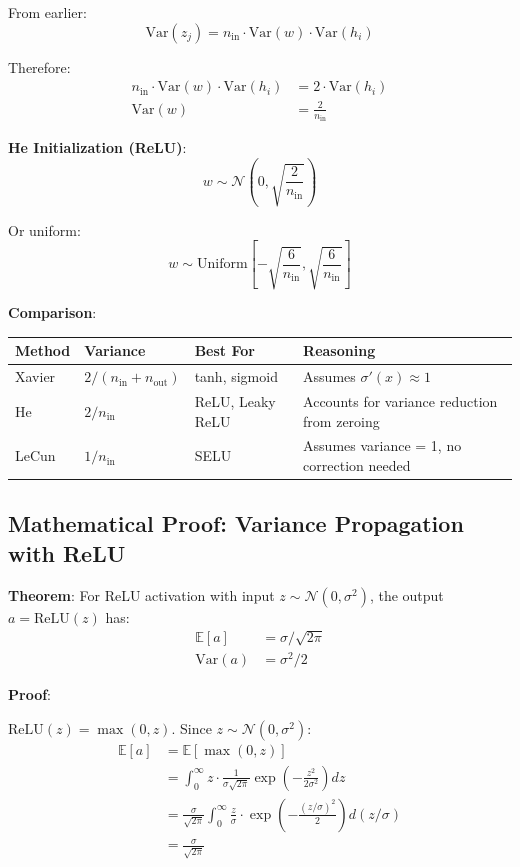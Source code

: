 From earlier:
\[
\text{Var}(z_j) = n_{\text{in}} \cdot \text{Var}(w) \cdot \text{Var}(h_i)
\]

Therefore:
\begin{align*}
n_{\text{in}} \cdot \text{Var}(w) \cdot \text{Var}(h_i) &= 2 \cdot \text{Var}(h_i) \\
\text{Var}(w) &= \frac{2}{n_{\text{in}}}
\end{align*}

\textbf{He Initialization (ReLU)}:
\[
w \sim \mathcal{N}\left(0, \sqrt{\frac{2}{n_{\text{in}}}}\right)
\]

Or uniform:
\[
w \sim \text{Uniform}\left[-\sqrt{\frac{6}{n_{\text{in}}}}, \sqrt{\frac{6}{n_{\text{in}}}}\right]
\]

\textbf{Comparison}:

\begin{table}[h]
\centering
\begin{tabular}{llll}
\toprule
\textbf{Method} & \textbf{Variance} & \textbf{Best For} & \textbf{Reasoning} \\
\midrule
Xavier & $2/(n_{\text{in}} + n_{\text{out}})$ & tanh, sigmoid & Assumes $\sigma'(x) \approx 1$ \\
He & $2/n_{\text{in}}$ & ReLU, Leaky ReLU & Accounts for variance reduction from zeroing \\
LeCun & $1/n_{\text{in}}$ & SELU & Assumes variance = 1, no correction needed \\
\bottomrule
\end{tabular}
\end{table}

\subsection{Mathematical Proof: Variance Propagation with ReLU}

\textbf{Theorem}: For ReLU activation with input $z \sim \mathcal{N}(0, \sigma^2)$, the output $a = \text{ReLU}(z)$ has:
\begin{align*}
\mathbb{E}[a] &= \sigma/\sqrt{2\pi} \\
\text{Var}(a) &= \sigma^2/2
\end{align*}

\textbf{Proof}:

$\text{ReLU}(z) = \max(0, z)$. Since $z \sim \mathcal{N}(0, \sigma^2)$:
\begin{align*}
\mathbb{E}[a] &= \mathbb{E}[\max(0, z)] \\
&= \int_0^\infty z \cdot \frac{1}{\sigma\sqrt{2\pi}} \exp\left(-\frac{z^2}{2\sigma^2}\right) dz \\
&= \frac{\sigma}{\sqrt{2\pi}} \int_0^\infty \frac{z}{\sigma} \cdot \exp\left(-\frac{(z/\sigma)^2}{2}\right) d(z/\sigma) \\
&= \frac{\sigma}{\sqrt{2\pi}}
\end{align*}


